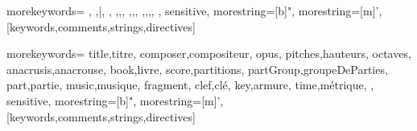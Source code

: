 


%
  {%
  morekeywords={%
  	\staff,%
		\barFormat,\bar,%
  	\beamsOff,%
		\new,\context,\with,%
		\absolute,\relative,\fixed,%
		\language,\clef,\key,\time,%
	},%
  sensitive,%
  morestring=[b]",%
  morestring=[m]', %
}[keywords,comments,strings,directives]%





%
  {%
  morekeywords={%
  	title,titre,%
		composer,compositeur,%
		opus,%
  	pitches,hauteurs,%
		octaves,%
		anacrusis,anacrouse,%
		book,livre,%
		score,partitions,%
		partGroup,groupeDeParties,%
		part,partie,%
  	music,musique,%
		fragment,%
		clef,clé,%
		key,armure,%
		time,métrique,%
	},%
  sensitive,%
  morestring=[b]",%
  morestring=[m]', %
}[keywords,comments,strings,directives]%





\newfont{}
\newcommand{\hand}[1]{
  \makebox[0pt][r]{
  	\textcolor{bordeaux}{\raisebox{-.5ex}{\pnt\symbol{'345}}}\hspace{1em}
	}%
	\hfill%
	{%
	  \setlength{\fboxsep}{2ex}%
	  \colorbox{white}{
	  	\parbox{.8\textwidth}{\textcolor{bordeaux}{\textbf{#1}}}
	  }
		\hfill
	}
}



\setlength{\parindent}{0mm}

\setlength{\parskip}{1.75ex plus \baselineskip minus 2pt}


